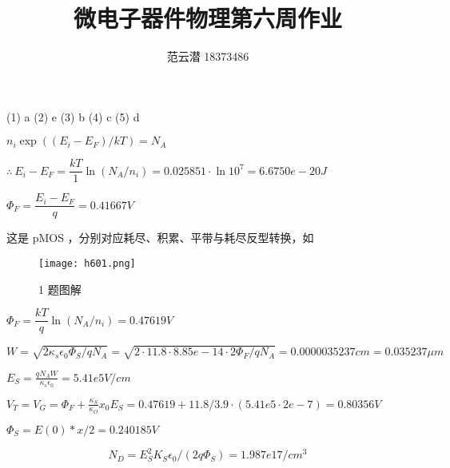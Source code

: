 \documentclass[lang=cn,11pt,a4paper,cite=authoryear,twocolumn]{elegantpaper}
\title{微电子器件物理\quad 第六周作业}
\author{范云潜 18373486}
\institute{微电子学院 184111 班}
\date{\zhtoday}
\begin{document}
\maketitle






(1) a (2) e (3) b (4) c (5) d 



\(n_i \exp ((E_i - E_F)/kT) = N_A\) 

\(\therefore\: E_i - E_F = \dfrac{kT}{1} \ln (N_A / n_i) = 0.025851 \cdot \ln 10^7 = 6.6750e-20 J\)

\(\Phi_F = \dfrac{E_i-E_F}{q} = 0.41667 V \)


这是 pMOS ，分别对应耗尽、积累、平带与耗尽反型转换，如 

\begin{figure}
    \centering
    \texttt{[image: h601.png]}
    \caption{1 题图解}\label{01}
\end{figure}



\(\Phi_F =  \dfrac{kT}{q} \ln (N_A / n_i) = 0.47619 V \)


\(W = \sqrt{2 \kappa_s \epsilon_0 \Phi_S / q N_A} = \sqrt{2 \cdot 11.8 \cdot 8.85e-14 \cdot 2 \Phi_F / q N_A} = 0.0000035237 cm = 0.035237 \mu m\)



\(E_S = \frac{q N_A W}{\kappa_s \epsilon_0} = 5.41e5 V/cm\) 


\(V_T = V_G = \Phi_F + \frac{\kappa_S}{\kappa_O}x_0 E_S = 0.47619 + 11.8/3.9\cdot(5.41e5 \cdot 2e-7) = 0.80356 V\)



\(\Phi_S = E(0) * x / 2 = 0.240185 V\)

\[N_D = E_S^2 K_S \epsilon_0 / (2 q \Phi_S) = 1.987e17 / cm^3\]
\end{document}
